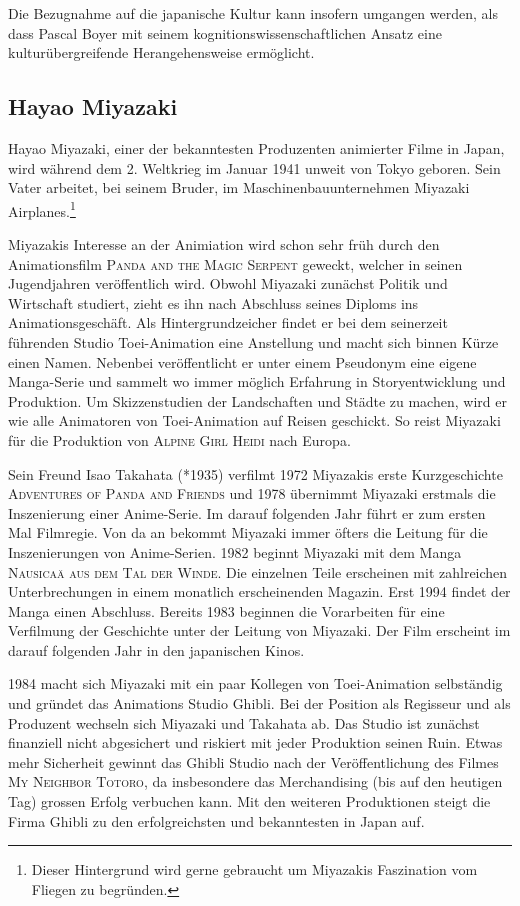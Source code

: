 Die Bezugnahme auf die japanische Kultur kann insofern umgangen werden, als dass Pascal Boyer mit seinem kognitionswissenschaftlichen Ansatz eine kulturübergreifende Herangehensweise ermöglicht.

\subsection{Hayao Miyazaki}
Hayao Miyazaki, einer der bekanntesten Produzenten animierter Filme in Japan, wird während dem 2. Weltkrieg im Januar 1941 unweit von Tokyo geboren. Sein Vater arbeitet, bei seinem Bruder, im Maschinenbauunternehmen Miyazaki Airplanes.\footnote{Dieser Hintergrund wird gerne gebraucht um Miyazakis Faszination vom Fliegen zu begründen.} 

Miyazakis Interesse an der Animiation wird schon sehr früh durch den Animationsfilm \textsc{Panda and the Magic Serpent} geweckt, welcher in seinen Jugendjahren veröffentlich wird. Obwohl Miyazaki zunächst Politik und Wirtschaft studiert, zieht es ihn nach Abschluss seines Diploms ins Animationsgeschäft. Als Hintergrundzeicher findet er bei dem seinerzeit führenden Studio Toei-Animation eine Anstellung und macht sich binnen Kürze einen Namen. Nebenbei veröffentlicht er unter einem Pseudonym eine eigene Manga-Serie und sammelt wo immer möglich Erfahrung in Storyentwicklung und Produktion. Um Skizzenstudien der Landschaften und Städte zu machen, wird er wie alle Ani\-matoren von Toei-Animation auf Reisen geschickt. So reist Miyazaki für die Produktion von \textsc{Alpine Girl Heidi} nach Europa.

Sein Freund Isao Takahata (*1935) verfilmt 1972 Miyazakis erste Kurz\-geschichte \textsc{Adventures of Panda and Friends} und 1978 übernimmt Miyazaki erstmals die Inszenierung einer Anime-Serie. Im darauf folgenden Jahr führt er zum ersten Mal Filmregie. Von da an bekommt Miyazaki immer öfters die Leitung für die Inszenierungen von Anime-Serien. 1982 beginnt Miyazaki mit dem Manga \textsc{Nausicaä aus dem Tal der Winde}. Die einzelnen Teile erscheinen mit zahlreichen Unterbrechungen in einem monatlich erscheinenden Magazin. Erst 1994 findet der Manga einen Abschluss. Bereits 1983 beginnen die Vorarbeiten für eine Verfilmung der Geschichte unter der Leitung von Miyazaki. Der Film erscheint im darauf folgenden Jahr in den japanischen Kinos. 

1984 macht sich Miyazaki mit ein paar Kollegen von Toei-Animation selbständig und gründet das Animations Studio Ghibli. Bei der Position als Regisseur und als Produzent wechseln sich Miyazaki und Takahata ab. Das Studio ist zunächst finanziell nicht abgesichert und riskiert mit jeder Produktion seinen Ruin. Etwas mehr Sicherheit gewinnt das Ghibli Studio nach der Veröffentlichung des Filmes \textsc{My Neighbor Totoro}, da insbesondere das Merchandising (bis auf den heutigen Tag) grossen Erfolg verbuchen kann. Mit den weiteren Produktionen steigt die Firma Ghibli zu den erfolgreichsten und be\-kanntesten in Japan auf. 

